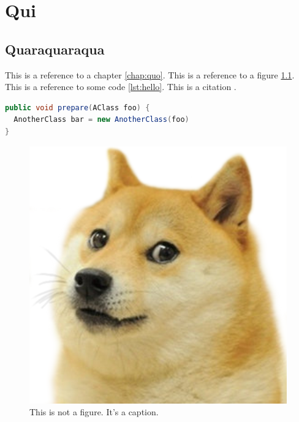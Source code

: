 \chapter{Qui}
\label{chap:qui}

\section{Quaraquaraqua}
\label{sec:quaqaraqua}

This is a reference to a chapter \ref{chap:quo}. This is a reference to a figure \ref{fig:doge}. This is a reference to some code \ref{lst:hello}. This is a citation \cite{famous:paper}.



\begin{lstlisting}[language=Java, label=lst:java, caption={Some code in another language than the default one}]
public void prepare(AClass foo) {
  AnotherClass bar = new AnotherClass(foo)
}
\end{lstlisting}

\Blindtext

\begin{figure}
  \begin{center}
    \includegraphics[width=0.5\columnwidth]{images/doge.png}
  \end{center}
  \caption{This is not a figure. It's a caption.}
  \label{fig:doge}
\end{figure}
